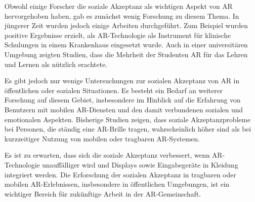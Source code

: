 Obwohl einige Forscher die soziale Akzeptanz als wichtigen Aspekt von AR
hervorgehoben haben, gab es zunächst wenig Forschung zu diesem Thema. In
jüngerer Zeit wurden jedoch einige Arbeiten durchgeführt. Zum Beispiel wurden
positive Ergebnisse erzielt, als AR-Technologie als Instrument für klinische
Schulungen in einem Krankenhaus eingesetzt wurde. Auch in einer universitären
Umgebung zeigten Studien, dass die Mehrheit der Studenten AR für das Lehren und
Lernen als nützlich erachtete.

Es gibt jedoch nur wenige Untersuchungen zur sozialen Akzeptanz von AR in
öffentlichen oder sozialen Situationen. Es besteht ein Bedarf an weiterer
Forschung auf diesem Gebiet, insbesondere im Hinblick auf die Erfahrung von
Benutzern mit mobilen AR-Diensten und den damit verbundenen sozialen und
emotionalen Aspekten. Bisherige Studien zeigen, dass soziale Akzeptanzprobleme
bei Personen, die ständig eine AR-Brille tragen, wahrscheinlich höher sind als
bei kurzzeitiger Nutzung von mobilen oder tragbaren AR-Systemen.

Es ist zu erwarten, dass sich die soziale Akzeptanz verbessert, wenn
AR-Technologie unauffälliger wird und Displays sowie Eingabegeräte in Kleidung
integriert werden. Die Erforschung der sozialen Akzeptanz in tragbaren oder
mobilen AR-Erlebnissen, insbesondere in öffentlichen Umgebungen, ist ein
wichtiger Bereich für zukünftige Arbeit in der AR-Gemeinschaft.